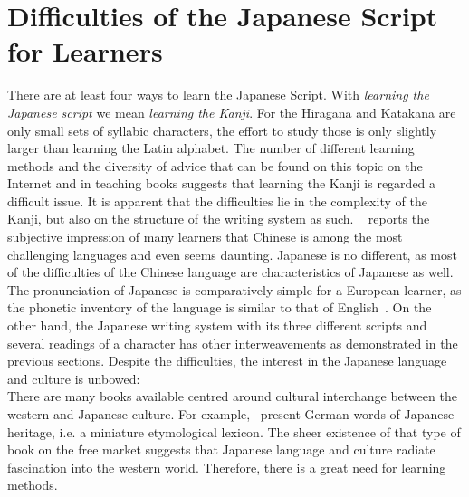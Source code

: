 \section{Difficulties of the Japanese Script for Learners}
\label{sec:japanesedifficulties}


There are at least four ways to learn the Japanese Script. 
With \emph{learning the Japanese script} we mean \emph{learning the Kanji}.
For the Hiragana and Katakana are only small sets of syllabic characters,
the effort to study those is only slightly larger than learning the Latin 
alphabet. The number of different learning methods and the diversity of advice
that can be found on this topic on the Internet and in teaching books suggests
that learning the Kanji is regarded a difficult issue.
It is apparent that the difficulties lie in the complexity of the Kanji, 
but also on the structure of the writing system as such. 
~\citeyear{Stahlmann2004} reports the subjective 
impression of many learners that Chinese is among the most challenging languages
and even seems daunting. Japanese is no different, as most of the difficulties 
of the Chinese language are characteristics of Japanese as well. 
The pronunciation of Japanese is comparatively simple for a European learner, 
as the phonetic inventory of the language is similar to that of 
English~. On the other hand, the Japanese writing 
system with its three different scripts and several readings of a character 
has other interweavements as demonstrated in the previous sections.
Despite the difficulties, the interest in the Japanese language and 
culture is unbowed:\\
There are many books available centred around cultural interchange between
the western and Japanese culture. For example,~ present
German words of Japanese heritage, i.e. a miniature etymological lexicon.
The sheer existence of that type of book on the free market suggests that 
Japanese language and culture radiate fascination into the western world.
Therefore, there is a great need for learning methods.

